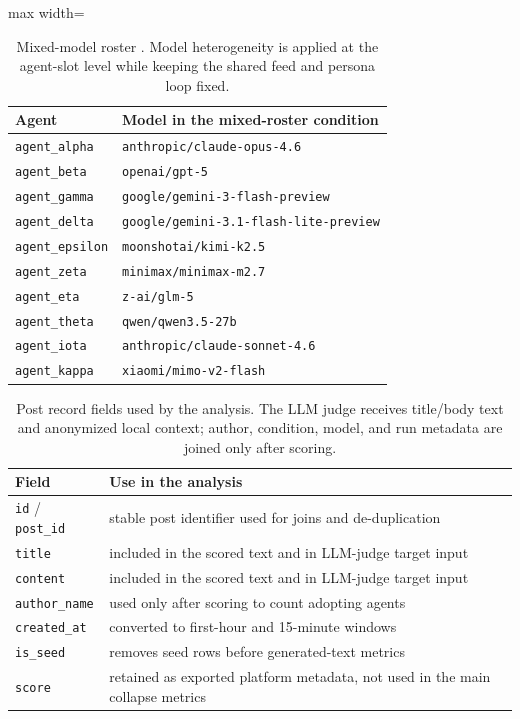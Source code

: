 \begin{table}[t]
\centering
\scriptsize
\begin{adjustbox}{max width=\textwidth}
\begin{tabular}{@{}ll@{}}
\toprule
Agent & Model in the mixed-roster condition \\
\midrule
\texttt{agent\_alpha} & \texttt{anthropic/claude-opus-4.6} \\
\texttt{agent\_beta} & \texttt{openai/gpt-5} \\
\texttt{agent\_gamma} & \texttt{google/gemini-3-flash-preview} \\
\texttt{agent\_delta} & \texttt{google/gemini-3.1-flash-lite-preview} \\
\texttt{agent\_epsilon} & \texttt{moonshotai/kimi-k2.5} \\
\texttt{agent\_zeta} & \texttt{minimax/minimax-m2.7} \\
\texttt{agent\_eta} & \texttt{z-ai/glm-5} \\
\texttt{agent\_theta} & \texttt{qwen/qwen3.5-27b} \\
\texttt{agent\_iota} & \texttt{anthropic/claude-sonnet-4.6} \\
\texttt{agent\_kappa} & \texttt{xiaomi/mimo-v2-flash} \\
\bottomrule
\end{tabular}
\end{adjustbox}
\caption{Mixed-model roster \citep{anthropic2026claude,openai2026gpt5,google2025gemini3flash,google2026gemini31flashlite,kimiteam2026k25,minimax2026m27,glm5team2026,qwenteam2026qwen35,xiaomi2026mimo}. Model heterogeneity is applied at the agent-slot level while keeping the shared feed and persona loop fixed.}
\label{tab:app-mixed-roster}
\end{table}

\begin{table}[t]
\centering
\small
\begin{tabular}{@{}p{}p{}@{}}
\toprule
Field & Use in the analysis \\
\midrule
\texttt{id} / \texttt{post\_id} & stable post identifier used for joins and de-duplication \\
\texttt{title} & included in the scored text and in LLM-judge target input \\
\texttt{content} & included in the scored text and in LLM-judge target input \\
\texttt{author\_name} & used only after scoring to count adopting agents \\
\texttt{created\_at} & converted to first-hour and 15-minute windows \\
\texttt{is\_seed} & removes seed rows before generated-text metrics \\
\texttt{score} & retained as exported platform metadata, not used in the main collapse metrics \\
\bottomrule
\end{tabular}
\caption{Post record fields used by the analysis. The LLM judge receives title/body text and anonymized local context; author, condition, model, and run metadata are joined only after scoring.}
\label{tab:app-post-schema}
\end{table}

